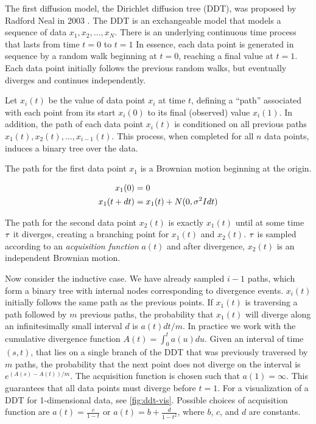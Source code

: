 The first diffusion model, the Dirichlet diffusion tree (DDT),
was proposed by Radford Neal in 2003 \citep{Neal2003}.
The DDT is an exchangeable model that models a sequence of data
$x_1, x_2,\ldots,x_N$.
There is an underlying continuous time process
that lasts from time $t = 0$ to $t = 1$
In essence, each data point is generated in sequence by
a random walk beginning at $t = 0$,
reaching a final value at $t = 1$.
Each data point initially follows the previous
random walks, but eventually diverges and continues independently.

Let $x_i(t)$ be the value of data point $x_i$
at time $t$, defining a ``path'' associated
with each point from its start $x_i(0)$ to its final (observed) value $x_i(1)$.
In addition, the path of each data point $x_i(t)$ is conditioned
on all previous paths $x_1(t), x_2(t), \ldots, x_{i -1 }(t)$.
This process, when completed for all $n$ data points,
induces a binary tree over the data.

The path for the first data point $x_1$
is a Brownian motion
beginning at the origin.

\begin{align}
  x_1(0) &= 0 \\
  x_1(t + dt) &= x_1(t) + N(0, \sigma^2Idt)
\end{align}

The path for the second data point $x_2(t)$
is exactly $x_1(t)$ until
at some time $\tau$ it diverges,
creating a branching point for
$x_1(t)$ and $x_2(t)$.
$\tau$ is sampled according to an \emph{acquisition function}
$a(t)$ and
after divergence, $x_2(t)$ is an
independent Brownian motion.

Now consider the inductive case.
We have already sampled $i - 1$
paths, which form a binary tree
with internal nodes corresponding to
divergence events.
$x_i(t)$ initially follows the same
path as the previous points.
If $x_1(t)$ is traversing a path
followed by $m$ previous paths,
the probability that $x_1(t)$ will
diverge along an infinitesimally small
interval $d$ is 
$a(t)dt/m$. 
In practice we work with the cumulative
divergence function $A(t) = \int_0^t a(u)du$.
Given an interval of time $(s, t)$,
that lies on a single branch of the DDT
that was previously traversed by $m$ paths,
the probability that the next point
does not diverge on the interval
is $e^{(A(s) - A(t))/m}$.
The acquisition function is chosen such that
$a(1) = \infty$. This guarantees that
all data points must diverge 
before $t = 1$. 
For a visualization of a DDT
for 1-dimensional data, see \autoref{fig:ddt-vis}.
Possible choices of acquisition function
are $a(t) = \frac{c}{1 - t}$ or $a(t) = b + \frac{d}{1 - t^2}$,
where $b$, $c$, and $d$ are constants.

